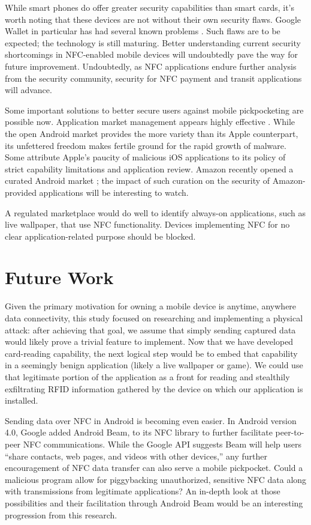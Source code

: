 \documentclass{sig-alternate}
\begin{document}
While smart phones do offer greater security capabilities than smart cards, it's worth noting that these devices are not without their own security flaws.  Google Wallet in particular has had several known problems \cite{google-wallet-pin-cracked} \cite{smartphonechamp-second-major-flaw-google-wallet}.  Such flaws are to be expected; the technology is still maturing.  Better understanding current security shortcomings in NFC-enabled mobile devices will undoubtedly pave the way for future improvement.  Undoubtedly, as NFC applications endure further analysis from the security community, security for NFC payment and transit applications will advance.  

Some important solutions to better secure users against mobile pickpocketing are possible now.  Application market management appears highly effective \cite{electronista-mcafee-malware-surge}.  While the open Android market provides the more variety than its Apple counterpart, its unfettered freedom makes fertile ground for the rapid growth of malware.  Some attribute Apple's paucity of malicious iOS applications to its policy of strict capability limitations and application review.  Amazon recently opened a curated Android market \cite{amazon-android-appstore}; the impact of such curation on the security of Amazon-provided applications will be interesting to watch.  

A regulated marketplace would do well to identify always-on applications, such as live wallpaper, that use NFC functionality.  Devices implementing NFC for no clear application-related purpose should be blocked.

\section{Future Work}
Given the primary motivation for owning a mobile device is anytime, anywhere data connectivity, this study focused on researching and implementing a physical attack:  after achieving that goal, we assume that simply sending captured data would likely prove a trivial feature to implement.  Now that we have developed card-reading capability, the next logical step would be to embed that capability in a seemingly benign application (likely a live wallpaper or game).  We could use that legitimate portion of the application as a front for reading and stealthily exfiltrating RFID information gathered by the device on which our application is installed.  

Sending data over NFC in Android is becoming even easier.  In Android version 4.0, Google added Android Beam, \cite{ieee-beacon-mobileos-review} to its NFC library to further facilitate peer-to-peer NFC communications.  While the Google API suggests Beam will help users ``share contacts, web pages, and videos with other devices,'' \cite{android-developers-beam} any further encouragement of NFC data transfer can also serve a mobile pickpocket.  Could a malicious program allow for piggybacking unauthorized, sensitive NFC data along with transmissions from legitimate applications?  An in-depth look at those possibilities and their facilitation through Android Beam would be an interesting progression from this research.       
\end{document}
